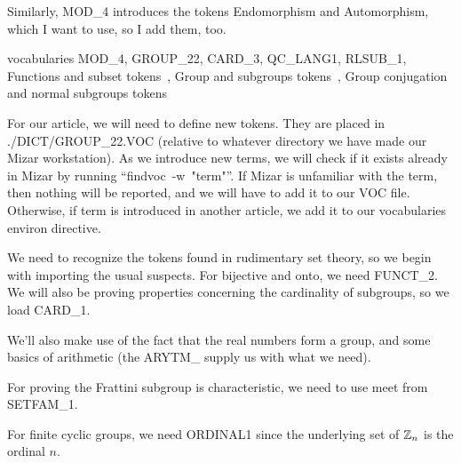 Similarly, {\Tt{}MOD{\_}4\nwendquote} introduces the tokens {\Tt{}Endomorphism\nwendquote} and
{\Tt{}Automorphism\nwendquote}, which I want to use, so I add them, too.

\nwenddocs{}\endmoddef\nwstartdeflinemarkup{}\nwenddeflinemarkup
vocabularies MOD_4, GROUP_22, CARD_3, QC_LANG1, RLSUB_1,
  \LA{}Functions and subset tokens~{\nwtagstyle{}}\RA{},
  \LA{}Group and subgroups tokens~{\nwtagstyle{}}\RA{},
  \LA{}Group conjugation and normal subgroups tokens~{\nwtagstyle{}}\RA{}
\nwendcode{}\nwdocspar

\begin{remark}
For our article, we will need to define new tokens. They are placed in
{\Tt{}./DICT/GROUP{\_}22.VOC\nwendquote} (relative to whatever directory we have made our
Mizar workstation). As we introduce new terms, we will check if it
exists already in Mizar by running ``{\Tt{}findvoc\ -w\ "term"\nwendquote}''. If Mizar
is unfamiliar with the term, then nothing will be reported, and we will
have to add it to our {\Tt{}VOC\nwendquote} file. Otherwise, if {\Tt{}term\nwendquote} is introduced
in another article, we add it to our {\Tt{}vocabularies\nwendquote} environ directive.
\end{remark}

We need to recognize the tokens found in rudimentary set theory, so we
begin with importing the usual suspects. For {\Tt{}bijective\nwendquote} and {\Tt{}onto\nwendquote},
we need {\Tt{}FUNCT{\_}2\nwendquote}. We will also be proving properties concerning the
cardinality of subgroups, so we load {\Tt{}CARD{\_}1\nwendquote}.

We'll also make use of the fact that the real numbers form a group, and
some basics of arithmetic (the {\Tt{}ARYTM{\_}\nwendquote} supply us with what we need).

For proving the Frattini subgroup is characteristic, we need to use
{\Tt{}meet\nwendquote} from {\Tt{}SETFAM{\_}1\nwendquote}.

For finite cyclic groups, we need {\Tt{}ORDINAL1\nwendquote} since the underlying set
of $\mathbb{Z}_{n}$ is the ordinal $n$.

